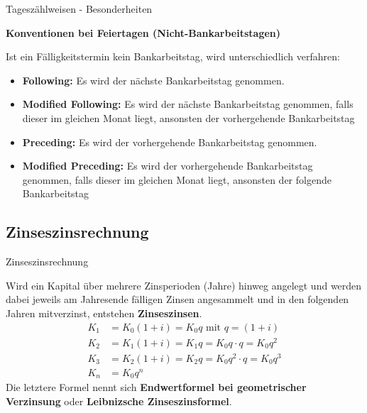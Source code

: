 \begin{frame}{Tageszählweisen - Besonderheiten}
	\begin{bemerkung}
		\textbf{Konventionen bei Feiertagen (Nicht-Bankarbeitstagen)}
		
		Ist ein Fälligkeitstermin kein Bankarbeitstag, wird unterschiedlich verfahren:
		
		\begin{itemize}
			\item \textbf{Following:} Es wird der nächste Bankarbeitstag genommen.
			\item \textbf{Modified Following:} Es wird der nächste Bankarbeitstag genommen, falls dieser im gleichen Monat liegt, ansonsten der vorhergehende Bankarbeitstag
			\item \textbf{Preceding:} Es wird der vorhergehende Bankarbeitstag genommen.
			\item \textbf{Modified Preceding:} Es wird der vorhergehende Bankarbeitstag genommen, falls dieser im gleichen Monat liegt, ansonsten der folgende Bankarbeitstag	
		\end{itemize}	
	\end{bemerkung}	
\end{frame}

\subsection{Zinseszinsrechnung}
\begin{frame}{Zinseszinsrechnung}
	\begin{bemerkung}
		Wird ein Kapital über mehrere Zinsperioden (Jahre) hinweg angelegt und werden dabei jeweils am Jahresende fälligen Zinsen angesammelt und in den folgenden Jahren mitverzinst, entstehen \textbf{Zinseszinsen}.
		\begin{align*}
		K_{1} & = K_{0} \left( 1 + i \right) = K_{0} q \text{ mit } q= (1+i) \\
		K_{2} & = K_{1} \left( 1 + i \right) = K_{1} q = K_{0} q \cdot q = K_{0} q^2 \\
		K_{3} & = K_{2} \left( 1 + i \right) = K_{2} q = K_{0} q^2 \cdot q= K_{0} q^3  \\
		K_{n} & = K_{0} q^n
		\end{align*}
		Die letztere Formel nennt sich \textbf{Endwertformel bei geometrischer Verzinsung} oder \textbf{Leibnizsche Zinseszinsformel}. 
	\end{bemerkung}
\end{frame}

